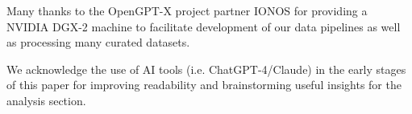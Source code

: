 \documentclass{article}
\begin{document}
Many thanks to the OpenGPT-X project partner IONOS for providing a NVIDIA DGX-2 machine 
to facilitate development of our data pipelines as well as processing
many curated datasets.




We acknowledge the use of AI tools (i.e. ChatGPT-4/Claude) in the early stages  of this paper
for improving readability and brainstorming useful insights for the analysis section. 

%


\pagebreak

\end{document}
